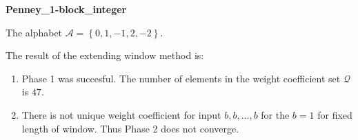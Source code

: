 \begin{exmp}
\textbf{ Penney\_1-block\_integer }

\label{ex:Penney1-blockinteger}

The alphabet $\mathcal{A} =\left\{0, 1, -1, 2, -2\right\}$.

The result of the extending window method is:
\begin{enumerate}
    \item Phase 1 was succesful.
The number of elements in the weight coefficient set $\mathcal{Q}$ is $47$.

    \item There is not unique weight coefficient for input $b,b,\dots,b$ for the $b= 1 $ for fixed length of window. Thus Phase 2 does not converge.

\end{enumerate}
\end{exmp}
